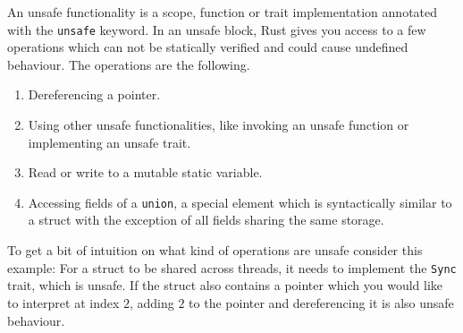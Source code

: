 \documentclass[11pt,
               a4paper,
               bibtotoc,
               idxtotoc,
               headsepline,
               footsepline,
               footexclude,
               BCOR12mm,
               DIV13,
               openany,   %
               ]
               {scrbook}
\begin{document}
An unsafe functionality is a scope, function or trait implementation annotated with the \texttt{unsafe} keyword. In an unsafe block, Rust gives you access to a few operations which can not be statically verified and could cause undefined behaviour. The operations are the following.

\begin{enumerate}
    \item Dereferencing a pointer.
    \item Using other unsafe functionalities, like invoking an unsafe function or implementing an unsafe trait.
    \item Read or write to a mutable static variable.
    \item Accessing fields of a \texttt{union}, a special element which is syntactically similar to a struct with the exception of all fields sharing the same storage.
\end{enumerate}

To get a bit of intuition on what kind of operations are unsafe consider this example: For a struct to be shared across threads, it needs to implement the \texttt{Sync} trait, which is unsafe. If the struct also contains a pointer which you would like to interpret at index $2$, adding $2$ to the pointer and dereferencing it is also unsafe behaviour.







\end{document}
